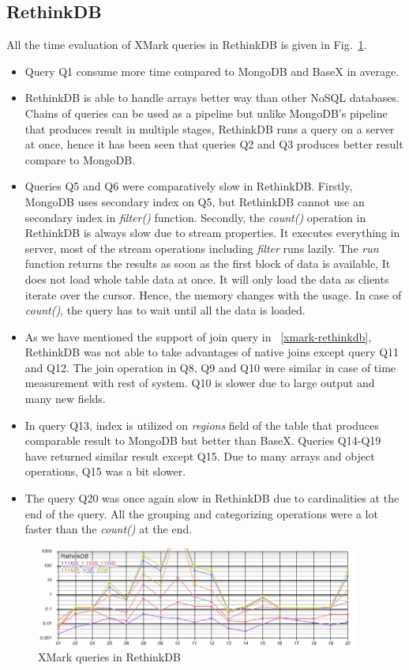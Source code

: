 \subsection{RethinkDB}
All the time evaluation of XMark queries in RethinkDB is given in Fig.~\ref{fig:xmark-result-rethinkdb-all}. 
\begin{itemize}
\item Query Q1 consume more time compared to MongoDB and BaseX in average.
 \item  
  RethinkDB is able to handle arrays better way than other NoSQL databases. Chains of queries can be used as a pipeline but unlike MongoDB's pipeline that produces result in multiple stages, RethinkDB runs a query on a server at once, hence it has been seen that queries Q2 and Q3 produces better result compare to MongoDB. 
 \item
 Queries Q5 and Q6 were comparatively slow in  RethinkDB. Firstly, MongoDB uses secondary index on Q5, but RethinkDB cannot use an secondary index in \textit{filter()} function. Secondly, the \textit{count()} operation in RethinkDB is always slow due to stream properties. It executes everything in server, most of the stream operations including \textit{filter} runs lazily. The \textit{run} function returns the results as soon as the first block of data is available, It does not load whole table data  at once. It will only load the data as clients iterate over the cursor. Hence, the memory changes with the usage. In case of \textit{count()}, the query has to wait until all the data is loaded. 
 \item As we have mentioned the support of join query in ~\ref{xmark-rethinkdb}, RethinkDB was not able to take advantages of native joins except query Q11 and Q12. The join operation in Q8, Q9 and Q10 were similar in case of time measurement with rest of system. Q10 is slower due to large output and many new fields. 
 \item In query Q13, index is utilized on \textit{regions} field of the table that produces comparable result to MongoDB but better than BaseX. Queries Q14-Q19 have returned similar result except Q15. Due to many arrays and object operations, Q15 was a bit slower. 
\item The query Q20 was once again slow in RethinkDB due to cardinalities at the end of the query. All the grouping and categorizing operations were a lot faster than the \textit{count()} at the end. 
\end{itemize}

\begin{figure}
	\centering
	\includegraphics[width=0.95\textwidth]{img/result/rethinkdb/rethinkdb-all}
	\caption{XMark queries in RethinkDB}
	\label{fig:xmark-result-rethinkdb-all}
\end{figure}

